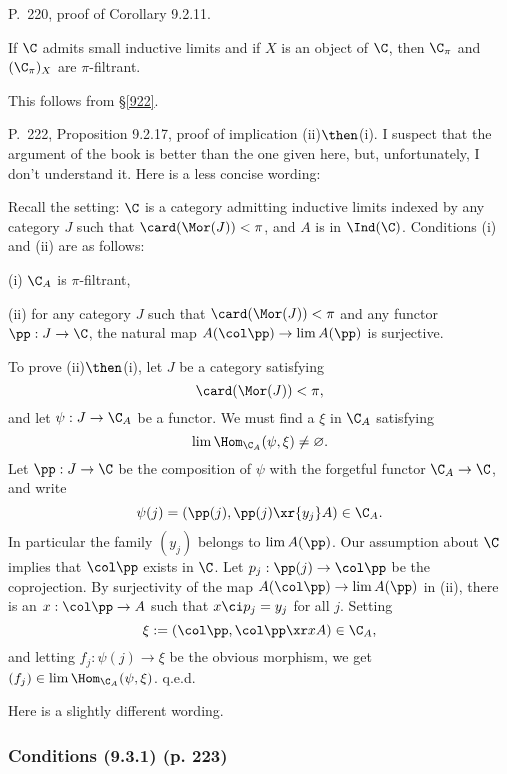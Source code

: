 \documentclass[12pt]{article}
\theoremstyle{remark}
\theoremstyle{definition}
\begin{document}
%

\begin{s} 
P.~220, proof of Corollary 9.2.11. 

\begin{cor}[Corollary 9.2.11 p.~220] 
If $\C$ admits small inductive limits and if $X$ is an object of $\C$, then $\C_\pi$ and $(\C_\pi)_X$ are $\pi$-filtrant. 
\end{cor}

This follows from \S\ref{922}.
\end{s}

%

\begin{s} 
P.~222, Proposition 9.2.17, proof of implication (ii)$\then$(i). I suspect that the argument of the book is better than the one given here, but, unfortunately, I don't understand it. Here is a less concise wording:

Recall the setting: $\C$ is a category admitting inductive limits indexed by any category $J$ such that $\card(\Mor(J))<\pi$, and $A$ is in $\Ind(\C)$. Conditions (i) and (ii) are as follows: 

\nn(i) $\C_A$ is $\pi$-filtrant, 

\nn(ii) for any category $J$ such that $\card(\Mor(J))<\pi$ and any functor $\pp:J\to\C$, the natural map $A(\col\pp)\to\lim A(\pp)$ is surjective. 

To prove (ii)$\then$(i), let $J$ be a category satisfying 
$$
\card(\Mor(J))<\pi,
$$ 
and let $\psi:J\to\C_A$ be a functor. We must find a $\xi$ in $\C_A$ satisfying 
$$
\lim\Hom_{\C_A}(\psi,\xi)\neq\varnothing.
$$ 
Let $\pp:J\to\C$ be the composition of $\psi$ with the forgetful functor $\C_A\to\C$, and write 
$$
\psi(j)=\left(\pp(j),\pp(j)\xr{y_j}A\right)\in\C_A.
$$ 
In particular the family $(y_j)$ belongs to $\lim A(\pp)$. Our assumption about $\C$ implies that $\col\pp$ exists in $\C$. Let $p_j:\pp(j)\to\col\pp$ be the coprojection. By surjectivity of the map $A(\col\pp)\to\lim A(\pp)$ in (ii), there is an $x:\col\pp\to A$ such that $x\ci p_j=y_j$ for all $j$. Setting 
$$
\xi:=\left(\col\pp,\col\pp\xr x A\right)\in\C_A,
$$ 
and letting $f_j:\psi(j)\to\xi$ be the obvious morphism, we get $(f_j)\in\lim\Hom_{\C_A}(\psi,\xi)$. q.e.d. 
\end{s}



Here is a slightly different wording. 

\subsubsection{Conditions (9.3.1) (p. 223)}
\end{document}
